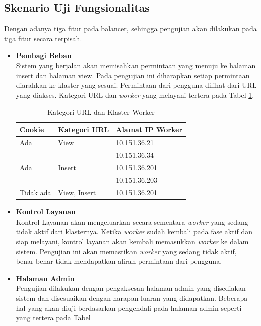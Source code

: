 \documentclass{ta-its}
\begin{document}
			\subsection{Skenario Uji Fungsionalitas}
				Dengan adanya tiga fitur pada balancer, sehingga pengujian akan dilakukan pada tiga fitur secara terpisah.
				\begin{itemize}
					\item \textbf{Pembagi Beban} \\
					Sistem yang berjalan akan memisahkan permintaan yang menuju	ke halaman insert dan halaman view. Pada pengujian ini diharapkan setiap permintaan diarahkan ke klaster yang sesuai. Permintaan dari pengguna dilihat dari URL yang diakses. Kategori URL dan \textit{worker} yang melayani tertera pada Tabel \ref{tabelKategoriURL}.
					
					\begin{longtable}{|p{}|p{0.3\textwidth}|p{}|} %
						
						\caption{Kategori URL dan Klaster Worker} \label{tabelKategoriURL} \\
						\hline
						\textbf{Cookie} & \textbf{Kategori URL} & \textbf{Alamat IP Worker} \\ \hline
						
						\endhead
						\endfoot
						\endlastfoot
						
						Ada & View & 10.151.36.21 \\ \cline{3-3}
						&& 10.151.36.34 \\ \hline
						Ada & Insert & 10.151.36.201 \\ \cline{3-3}
						&& 10.151.36.203 \\ \hline
						Tidak ada & View, Insert & 10.151.36.201 \\ \hline
						
						
					\end{longtable}
					
					\item \textbf{Kontrol Layanan} \\
					Kontrol Layanan akan mengeluarkan secara sementara \textit{worker} yang sedang tidak aktif dari klasternya. Ketika \textit{worker} sudah kembali pada fase aktif dan siap melayani, kontrol layanan akan kembali memasukkan \textit{worker} ke dalam sistem. Pengujian ini akan memastikan \textit{worker} yang sedang tidak aktif, benar-benar tidak mendapatkan aliran permintaan dari pengguna.
					
					
					\item \textbf{Halaman Admin} \\
					Pengujian dilakukan dengan pengaksesan halaman admin yang disediakan sistem dan disesuaikan dengan harapan luaran yang didapatkan. Beberapa hal yang akan diuji berdasarkan pengendali pada halaman admin seperti yang tertera pada Tabel
				\end{itemize}
				
\end{document}
